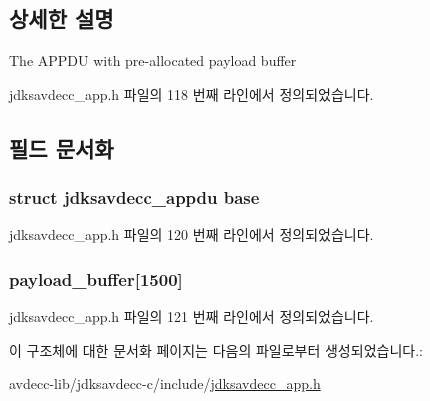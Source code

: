 \subsection{상세한 설명}
The A\+P\+P\+DU with pre-\/allocated payload buffer 

jdksavdecc\+\_\+app.\+h 파일의 118 번째 라인에서 정의되었습니다.



\subsection{필드 문서화}
\subsubsection[{\texorpdfstring{base}{base}}]{\setlength{\rightskip}{0pt plus 5cm}struct {\bf jdksavdecc\+\_\+appdu} base}\hypertarget{structjdksavdecc__fullappdu_af973673f33f79bf957f4ef909e1b7b04}{}\label{structjdksavdecc__fullappdu_af973673f33f79bf957f4ef909e1b7b04}


jdksavdecc\+\_\+app.\+h 파일의 120 번째 라인에서 정의되었습니다.

\subsubsection[{\texorpdfstring{payload\+\_\+buffer}{payload_buffer}}]{ payload\+\_\+buffer\mbox{[}1500\mbox{]}}\hypertarget{structjdksavdecc__fullappdu_a23bd2d236338419a618efe0b79516509}{}\label{structjdksavdecc__fullappdu_a23bd2d236338419a618efe0b79516509}


jdksavdecc\+\_\+app.\+h 파일의 121 번째 라인에서 정의되었습니다.



이 구조체에 대한 문서화 페이지는 다음의 파일로부터 생성되었습니다.\+:\begin{DoxyCompactItemize}
\item 
avdecc-\/lib/jdksavdecc-\/c/include/\hyperlink{jdksavdecc__app_8h}{jdksavdecc\+\_\+app.\+h}\end{DoxyCompactItemize}
